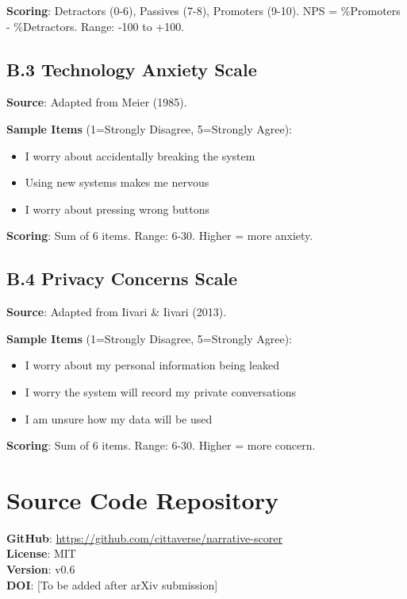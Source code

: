 \documentclass[11pt]{article}
\begin{document}
\textbf{Scoring}: 
Detractors (0-6), Passives (7-8), Promoters (9-10). 
NPS = \%Promoters - \%Detractors. Range: -100 to +100.

\subsection*{B.3 Technology Anxiety Scale}

\textbf{Source}: Adapted from Meier (1985).

\textbf{Sample Items} (1=Strongly Disagree, 5=Strongly Agree):
\begin{itemize}
  \item I worry about accidentally breaking the system
  \item Using new systems makes me nervous
  \item I worry about pressing wrong buttons
\end{itemize}

\textbf{Scoring}: Sum of 6 items. Range: 6-30. Higher = more anxiety.

\subsection*{B.4 Privacy Concerns Scale}

\textbf{Source}: Adapted from Iivari \& Iivari (2013).

\textbf{Sample Items} (1=Strongly Disagree, 5=Strongly Agree):
\begin{itemize}
  \item I worry about my personal information being leaked
  \item I worry the system will record my private conversations
  \item I am unsure how my data will be used
\end{itemize}

\textbf{Scoring}: Sum of 6 items. Range: 6-30. Higher = more concern.

\section{Source Code Repository}
\label{app:source-code}

\textbf{GitHub}: \url{https://github.com/cittaverse/narrative-scorer} \\
\textbf{License}: MIT \\
\textbf{Version}: v0.6 \\
\textbf{DOI}: [To be added after arXiv submission]
\end{document}
